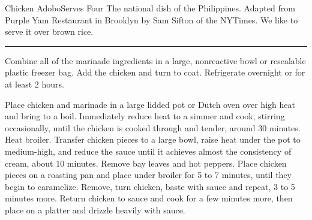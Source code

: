 \begin{recipe}{Chicken Adobo}{Serves Four}{}
\freeform The national dish of the Philippines. Adapted from Purple Yam Restaurant in Brooklyn by Sam Sifton of the NYTimes. We like to serve it over brown rice.\\
\rule{\textwidth}{0.05pt}


Combine all of the marinade ingredients in a large, nonreactive bowl
or resealable plastic freezer bag. Add the chicken and turn to
coat. Refrigerate overnight or for at least 2 hours.

\freeform Place chicken and marinade in a large lidded pot or Dutch
oven over high heat and bring to a boil. Immediately reduce heat to a
simmer and cook, stirring occasionally, until the chicken is cooked
through and tender, around 30 minutes.  Heat broiler. Transfer chicken
pieces to a large bowl, raise heat under the pot to medium-high, and
reduce the sauce until it achieves almost the consistency of cream,
about 10 minutes. Remove bay leaves and hot peppers.  Place chicken pieces
on a roasting pan and place under broiler for 5 to 7 minutes, until
they begin to caramelize. Remove, turn chicken, baste with sauce and
repeat, 3 to 5 minutes more. Return chicken to sauce and cook for a
few minutes more, then place on a platter and drizzle heavily with
sauce.
\end{recipe}
